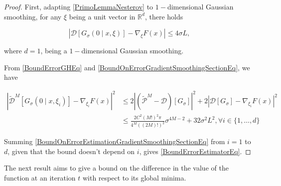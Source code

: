 \begin{proof}

First, adapting \ref{PrimoLemmaNesterov} to $1-$dimensional Gaussian smoothing, for any $ \xi $ being a unit vector in $ \mathbb{R}^{d} $, there holds

\begin{equation}\label{BoundOnErrorGradientSmoothingSectionEq}
\left|\mathcal{D}\left[G_{\sigma}(0 \mid x, \xi)\right]-\nabla_{\xi} F(x)\right| \leq 4 \sigma L,
\end{equation}

where $d=1$, being a $1-$dimensional Gaussian smoothing.

From \ref{BoundErrorGHEq} and \ref{BoundOnErrorGradientSmoothingSectionEq}, we have

\begin{equation}\label{BoundOnErrorEstimationGradientSmoothingSectionEq}
 \begin{aligned}\left|\widetilde{\mathcal{D}}^{M}\left[G_{\sigma}\left(0 \mid x, \xi_{i}\right)\right]-\nabla_{\xi_{i}} F(x)\right|^{2} & \leq 2\left|\left(\widetilde{\mathcal{P}}^{M}-\mathcal{D}\right)\left[G_{\sigma}\right]\right|^{2}+2\left|\mathcal{D}\left[G_{\sigma}\right]-\nabla_{\xi_{i}} F(x)\right|^{2} \\ & \leq \frac{2 C^{2}(M !)^{2} \pi}{4^{M}((2 M) !)^{2}} \sigma^{4 M-2}+32 \sigma^{2} L^{2}, \forall i \in\{1, \ldots, d\} \end{aligned} 
\end{equation}

Summing \ref{BoundOnErrorEstimationGradientSmoothingSectionEq} from $ i=1 $ to $ d $, given that the bound doesn't depend on $i$, gives \ref{BoundErrorEstimatorEq}.

\end{proof}

The next result aims to give a bound on the difference in the value of the function at an iteration $t$ with respect to its global minima.

